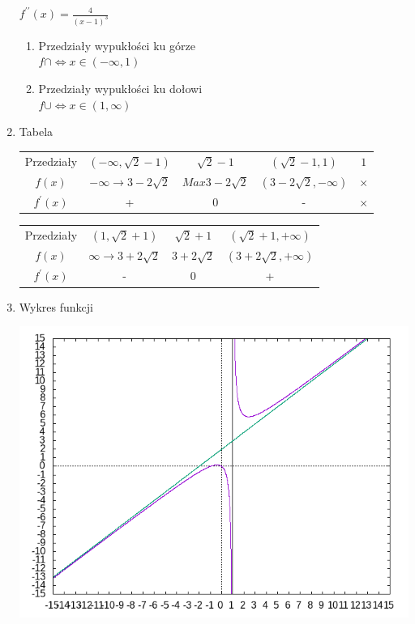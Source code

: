\documentclass[11pt]{scrartcl}
\begin{document}
\begin{enumerate}
			$ f^{\prime\prime}(x) = \frac{4}{(x-1)^3} $
			\begin{enumerate}
				\item Przedziały wypukłości ku górze \\
				$ f\cap \Leftrightarrow x \in (-\infty, 1) $
				\item Przedziały wypukłości ku dołowi \\
				$ f\cup \Leftrightarrow x \in (1,\infty) $
			\end{enumerate}
		\item Tabela \\
			\begin{center}
				\begin{tabular}{ |c|c|c|c|c| } 
					\hline
					Przedziały &
						$ (-\infty, \sqrt{2} -1) $ &
						$ \sqrt{2} -1 $ & 
						$ (\sqrt{2} -1, 1) $ &
						$ 1 $ \\
					$ f(x) $ &
						$ -\infty \to 3 - 2\sqrt{2} $ &
						$ Max 3 - 2\sqrt{2} $ &
						$ (3 - 2\sqrt{2}, -\infty) $ &
						$ \times $ \\
					$ f^{\prime}(x) $ &
						+ &
						0 &
						- &
						$ \times $ \\
					\hline
			\end{tabular}
			\begin{tabular}{ |c|c|c|c| } 
				\hline
				Przedziały &
					$ (1, \sqrt{2} + 1) $ &
					$ \sqrt{2} + 1 $ &
					$ (\sqrt{2} + 1, +\infty) $\\
				$ f(x) $ &
					$ \infty \to 3 + 2\sqrt{2} $ &
					$ 3 + 2\sqrt{2} $ &
					$ (3 + 2\sqrt{2}, + \infty) $ \\
				$ f^{\prime}(x) $ &
					- &
					0 &
					+  \\
				\hline
			\end{tabular}
			\end{center}
		\item Wykres funkcji \\
			\begin{center}
				\includegraphics[scale=0.6]{funkcja1}
			\end{center}
			
	\end{enumerate}

	
\end{document}
